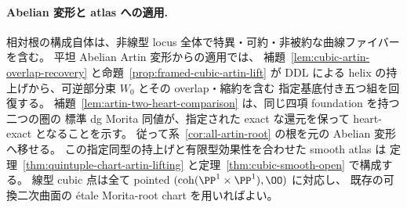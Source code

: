 \paragraph{Abelian 変形と atlas への適用.}
相対根の構成自体は、非線型 locus 全体で特異・可約・非被約な曲線ファイバーを含む。
平坦 Abelian Artin 変形からの適用では、
補題~\ref{lem:cubic-artin-overlap-recovery} と命題~\ref{prop:framed-cubic-artin-lift} が
DDL による helix の持上げから、可逆部分束 $W_0$ とその overlap・縮約を含む
指定基底付き五つ組を回復する。
補題~\ref{lem:artin-two-heart-comparison} は、同じ四項 foundation を持つ二つの圏の
標準 dg Morita 同値が、指定された exact な還元を保って heart-exact となることを示す。
従って系~\ref{cor:all-artin-root} の根を元の Abelian 変形へ移せる。
この指定同型の持上げと有限型効果性を合わせた smooth atlas は
定理~\ref{thm:quintuple-chart-artin-lifting} と定理~\ref{thm:cubic-smooth-open} で構成する。
線型 cubic 点は全て pointed $(\operatorname{coh}(\PP^1\times\PP^1),\OO)$ に対応し、
既存の可換二次曲面の étale Morita-root chart を用いればよい。

